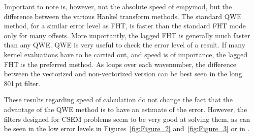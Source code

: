 \documentclass[manuscript,revised]{geophysics}
\begin{document}
%
Important to note is, however, not the absolute speed of empymod, but the
difference between the various Hankel transform methods. The standard QWE
method, for a similar error level as FHT, is faster than the standard FHT mode
only for many offsets. More importantly, the lagged FHT is generally much
faster than any QWE. QWE is very useful to check the error level of a result.
If many kernel evaluations have to be carried out, and speed is of importance,
the lagged FHT is the preferred method. As \cite{GEO.12.Key} loops over each
wavenumber, the difference between the vectorized and non-vectorized version
can be best seen in the long 801\,pt filter.

These results regarding speed of calculation do not change the fact that the
advantage of the QWE method is to have an estimate of the error. However, the
filters designed for CSEM problems seem to be very good at solving them, as can
be seen in the low error levels in Figures~\ref{fig:Figure_2}
and~\ref{fig:Figure_3} or in \cite{GEO.12.Key}.
\end{document}
